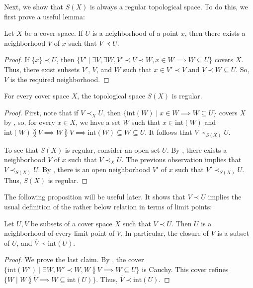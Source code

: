 \documentclass[pdflatex,sn-mathphys-num]{sn-jnl}
\theoremstyle{definition}
\theoremstyle{remark}
\numberwithin{figure}{section}
\newcommand{\overlap}[2]{#1 \between #2}
\newcommand{\rb}{\prec}
\begin{document}
Next, we show that $S(X)$ is always a regular topological space.
To do this, we first prove a useful lemma:

\begin{lem}[rb-point]
Let $X$ be a cover space.
If $U$ is a neighborhood of a point $x$, then there exists a neighborhood $V$ of $x$ such that $V \rb U$.
\end{lem}
\begin{proof}
If $\{ x \} \rb U$, then $\{ V' \mid \exists V, \exists W, V' \rb V \rb W, x \in W \implies W \subseteq U \}$ covers $X$.
Thus, there exist subsets $V'$, $V$, and $W$ such that $x \in V' \rb V$ and $V \rb W \subseteq U$.
So, $V$ is the required neighborhood.
\end{proof}

\begin{prop}
For every cover space $X$, the topological space $S(X)$ is regular.
\end{prop}
\begin{proof}
First, note that if $V \rb_X U$, then $\{ \mathrm{int}(W) \mid x \in W \implies W \subseteq U \}$ covers $X$ by ,
so, for every $x \in X$, we have a set $W$ such that $x \in \mathrm{int}(W)$ and $\overlap{\mathrm{int}(W)}{V} \implies \overlap{W}{V} \implies \mathrm{int}(W) \subseteq W \subseteq U$.
It follows that $V \rb_{S(X)} U$.

To see that $S(X)$ is regular, consider an open set $U$.
By , there exists a neighborhood $V$ of $x$ such that $V \rb_X U$.
The previous observation implies that $V \rb_{S(X)} U$.
By , there is an open neighborhood $V'$ of $x$ such that $V' \rb_{S(X)} U$.
Thus, $S(X)$ is regular.
\end{proof}

The following proposition will be useful later.
It shows that $V \rb U$ implies the usual definition of the rather below relation in terms of limit points:

\begin{prop}[rb-closure]
Let $U,V$ be subsets of a cover space $X$ such that $V \rb U$.
Then $U$ is a neighborhood of every limit point of $V$.
In particular, the closure of $V$ is a subset of $U$, and $\overline{V} \rb \mathrm{int}(U)$.
\end{prop}
\begin{proof}
We prove the last claim.
By , the cover $\{ \mathrm{int}(W') \mid \exists W, W' \rb W, \overlap{W}{V} \implies W \subseteq U \}$ is Cauchy.
This cover refines $\{ W \mid \overlap{W}{\overline{V}} \implies W \subseteq \mathrm{int}(U) \}$.
Thus, $\overline{V} \rb \mathrm{int}(U)$.
\end{proof}
\end{document}
